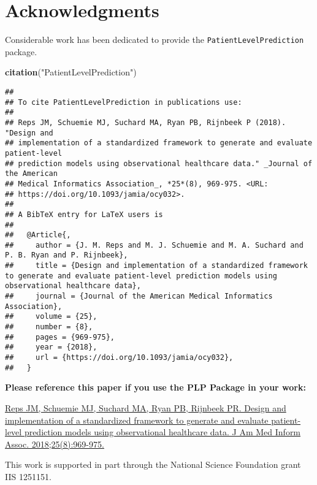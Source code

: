 \documentclass[
]{article}
\newenvironment{Shaded}{\begin{snugshade}}{\end{snugshade}}
\newcommand{\KeywordTok}[1]{\textcolor[rgb]{0.13,0.29,0.53}{\textbf{#1}}}
\newcommand{\NormalTok}[1]{#1}
\newcommand{\StringTok}[1]{\textcolor[rgb]{0.31,0.60,0.02}{#1}}
\begin{document}
\hypertarget{acknowledgments}{%
\section{Acknowledgments}\label{acknowledgments}}

Considerable work has been dedicated to provide the
\texttt{PatientLevelPrediction} package.

\begin{Shaded}
\begin{Highlighting}[]
\KeywordTok{citation}\NormalTok{(}\StringTok{"PatientLevelPrediction"}\NormalTok{)}
\end{Highlighting}
\end{Shaded}

\begin{verbatim}
## 
## To cite PatientLevelPrediction in publications use:
## 
## Reps JM, Schuemie MJ, Suchard MA, Ryan PB, Rijnbeek P (2018). "Design and
## implementation of a standardized framework to generate and evaluate patient-level
## prediction models using observational healthcare data." _Journal of the American
## Medical Informatics Association_, *25*(8), 969-975. <URL:
## https://doi.org/10.1093/jamia/ocy032>.
## 
## A BibTeX entry for LaTeX users is
## 
##   @Article{,
##     author = {J. M. Reps and M. J. Schuemie and M. A. Suchard and P. B. Ryan and P. Rijnbeek},
##     title = {Design and implementation of a standardized framework to generate and evaluate patient-level prediction models using observational healthcare data},
##     journal = {Journal of the American Medical Informatics Association},
##     volume = {25},
##     number = {8},
##     pages = {969-975},
##     year = {2018},
##     url = {https://doi.org/10.1093/jamia/ocy032},
##   }
\end{verbatim}

\textbf{Please reference this paper if you use the PLP Package in your
work:}

\href{http://dx.doi.org/10.1093/jamia/ocy032}{Reps JM, Schuemie MJ,
Suchard MA, Ryan PB, Rijnbeek PR. Design and implementation of a
standardized framework to generate and evaluate patient-level prediction
models using observational healthcare data. J Am Med Inform Assoc.
2018;25(8):969-975.}

This work is supported in part through the National Science Foundation
grant IIS 1251151.
\end{document}
